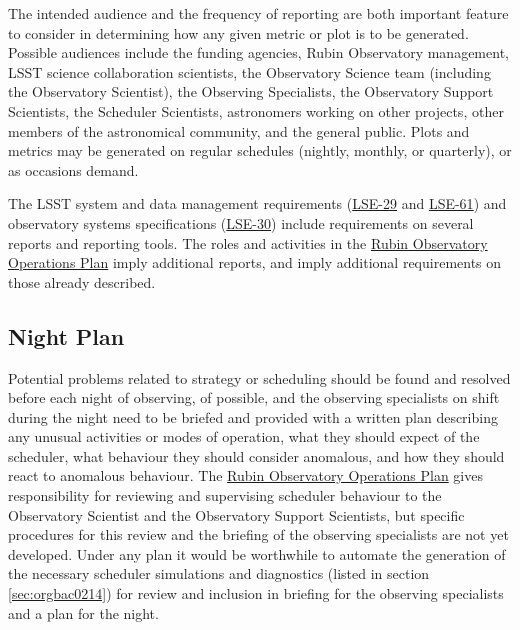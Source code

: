 The intended audience and the frequency of reporting are both important feature to consider in determining how any given metric or plot is to be generated.
Possible audiences include the funding agencies, Rubin Observatory management, LSST science collaboration scientists, the Observatory Science team (including the Observatory Scientist), the Observing Specialists, the Observatory Support Scientists, the Scheduler Scientists, astronomers working on other projects, other members of the astronomical community, and the general public. 
Plots and metrics may be generated on regular schedules (nightly, monthly, or quarterly), or as occasions demand.

The LSST system and data management requirements (\href{https://ls.st/lse-29}{LSE-29} and \href{https://ls.st/lse-61}{LSE-61}) and observatory systems specifications (\href{https://ls.st/lse-30}{LSE-30}) include requirements on several reports and reporting tools. The roles and activities in the \href{https://docushare.lsst.org/docushare/dsweb/Get/Document-36797/Rubin\%20Observatory\%20Operations\%20Plan\%20April\%202020.pdf}{Rubin Observatory Operations Plan} imply additional reports, and imply additional requirements on those already described.

\subsection{Night Plan}
\label{sec:org2f466bb}

Potential problems related to strategy or scheduling should be found and resolved before each night of observing, of possible, and the observing specialists on shift during the night need to be briefed and provided with a written plan describing any unusual activities or modes of operation, what they should expect of the scheduler, what behaviour they should consider anomalous, and how they should react to anomalous behaviour.
The \href{https://docushare.lsst.org/docushare/dsweb/Get/Document-36797/Rubin\%20Observatory\%20Operations\%20Plan\%20April\%202020.pdf}{Rubin Observatory Operations Plan} gives responsibility for reviewing and supervising scheduler behaviour to the Observatory Scientist and the Observatory Support Scientists, but specific procedures for this review and the briefing of the observing specialists are not yet developed.
Under any plan it would be worthwhile to automate the generation of the necessary scheduler simulations and diagnostics (listed in section \ref{sec:orgbac0214}) for review and inclusion in briefing for the observing specialists and a plan for the night.

